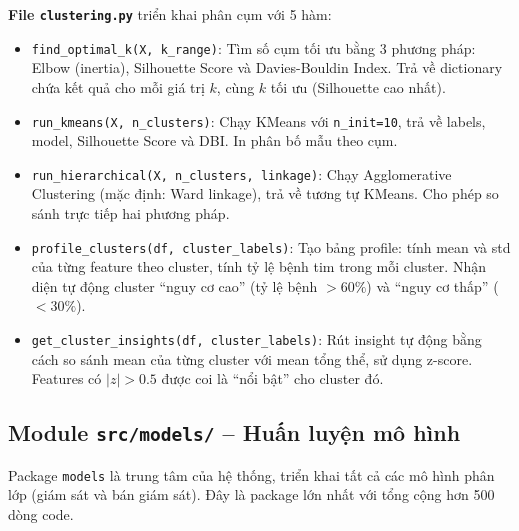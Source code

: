 \textbf{File \texttt{clustering.py}} triển khai phân cụm với 5 hàm:
\begin{itemize}
    \item \texttt{find\_optimal\_k(X, k\_range)}: Tìm số cụm tối ưu bằng 3 phương pháp: Elbow (inertia), Silhouette Score và Davies-Bouldin Index. Trả về dictionary chứa kết quả cho mỗi giá trị $k$, cùng $k$ tối ưu (Silhouette cao nhất).
    \item \texttt{run\_kmeans(X, n\_clusters)}: Chạy KMeans với \texttt{n\_init=10}, trả về labels, model, Silhouette Score và DBI. In phân bố mẫu theo cụm.
    \item \texttt{run\_hierarchical(X, n\_clusters, linkage)}: Chạy Agglomerative Clustering (mặc định: Ward linkage), trả về tương tự KMeans. Cho phép so sánh trực tiếp hai phương pháp.
    \item \texttt{profile\_clusters(df, cluster\_labels)}: Tạo bảng profile: tính mean và std của từng feature theo cluster, tính tỷ lệ bệnh tim trong mỗi cluster. Nhận diện tự động cluster ``nguy cơ cao'' (tỷ lệ bệnh $> 60\%$) và ``nguy cơ thấp'' ($< 30\%$).
    \item \texttt{get\_cluster\_insights(df, cluster\_labels)}: Rút insight tự động bằng cách so sánh mean của từng cluster với mean tổng thể, sử dụng z-score. Features có $|z| > 0.5$ được coi là ``nổi bật'' cho cluster đó.
\end{itemize}

\subsection{Module \texttt{src/models/} -- Huấn luyện mô hình}

Package \texttt{models} là trung tâm của hệ thống, triển khai tất cả các mô hình phân lớp (giám sát và bán giám sát). Đây là package lớn nhất với tổng cộng hơn 500 dòng code.

